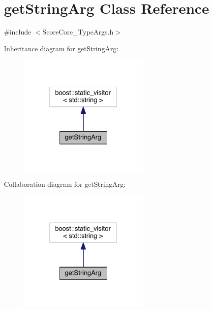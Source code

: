 \hypertarget{classget_string_arg}{\section{get\-String\-Arg Class Reference}
\label{classget_string_arg}
}


{\ttfamily \#include $<$Score\-Core\-\_\-\-Type\-Args.\-h$>$}



Inheritance diagram for get\-String\-Arg\-:\nopagebreak
\begin{figure}[H]
\begin{center}
\leavevmode
\includegraphics[width=182pt]{classget_string_arg__inherit__graph}
\end{center}
\end{figure}


Collaboration diagram for get\-String\-Arg\-:\nopagebreak
\begin{figure}[H]
\begin{center}
\leavevmode
\includegraphics[width=182pt]{classget_string_arg__coll__graph}
\end{center}
\end{figure}
